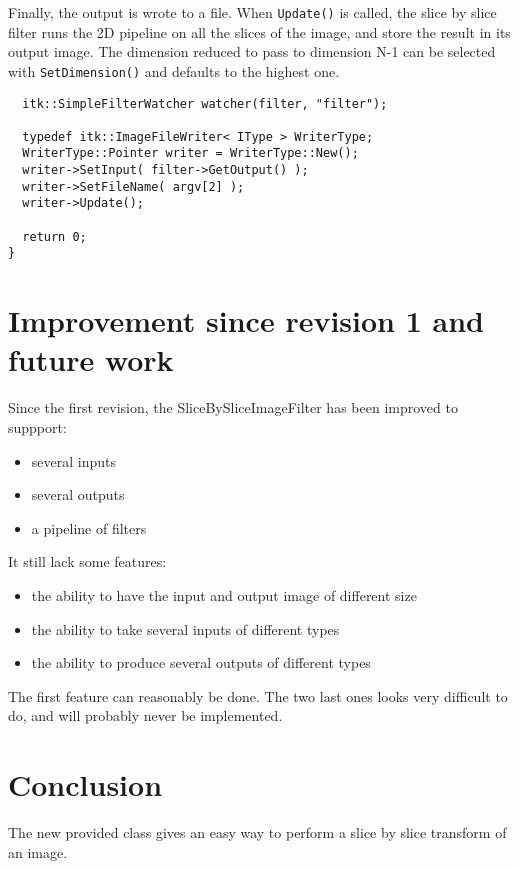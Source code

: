\documentclass{InsightArticle}
\begin{document}
Finally, the output is wrote to a file. When \verb$Update()$ is called, the
slice by slice filter runs the 2D pipeline on all the slices of the image,
and store the result in its output image. The dimension reduced to pass to
dimension N-1 can be selected with \verb$SetDimension()$ and defaults to
the highest one.

\small \begin{verbatim}
  itk::SimpleFilterWatcher watcher(filter, "filter");

  typedef itk::ImageFileWriter< IType > WriterType;
  WriterType::Pointer writer = WriterType::New();
  writer->SetInput( filter->GetOutput() );
  writer->SetFileName( argv[2] );
  writer->Update();

  return 0;
}
\end{verbatim} \normalsize


\section{Improvement since revision 1 and future work}

Since the first revision, the SliceBySliceImageFilter has been improved to suppport:
\begin{itemize}
\item several inputs
\item several outputs
\item a pipeline of filters
\end{itemize}

It still lack some features:
\begin{itemize}
\item the ability to have the input and output image of different size
\item the ability to take several inputs of different types
\item the ability to produce several outputs of different types
\end{itemize}
The first feature can reasonably be done. The two last ones looks very difficult to do, and will probably never be implemented.

\section{Conclusion}

The new provided class gives an easy way to perform a slice by slice transform of an image.


\end{document}
